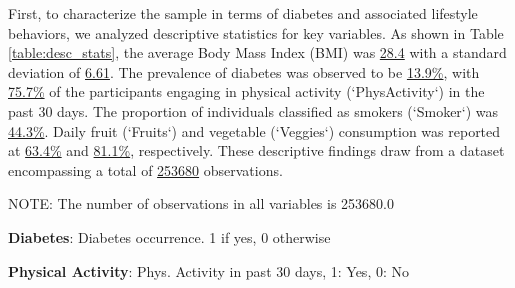 \documentclass[11pt]{article}
\begin{document}
First, to characterize the sample in terms of diabetes and associated lifestyle behaviors, we analyzed descriptive statistics for key variables. As shown in Table \ref{table:desc_stats}, the average Body Mass Index (BMI) was \hyperlink{A1a}{28.4} with a standard deviation of \hyperlink{A1b}{6.61}. The prevalence of diabetes was observed to be \hyperlink{A0a}{13.9\%}, with \hyperlink{A2a}{75.7\%} of the participants engaging in physical activity (`PhysActivity`) in the past 30 days. The proportion of individuals classified as smokers (`Smoker`) was \hyperlink{A3a}{44.3\%}. Daily fruit (`Fruits`) and vegetable (`Veggies`) consumption was reported at \hyperlink{A4a}{63.4\%} and \hyperlink{A5a}{81.1\%}, respectively. These descriptive findings draw from a dataset encompassing a total of \hyperlink{R0a}{253680} observations.

\begin{table}[h]
\caption{\protect\hyperlink{file-table-0-pkl}{Descriptive statistics of key variables}}
\label{table:desc_stats}
\begin{threeparttable}
\renewcommand{\TPTminimum}{\linewidth}
\begin{tablenotes}
\footnotesize
\item NOTE: The number of observations in all variables is 253680.0
\item \textbf{Diabetes}: Diabetes occurrence. 1 if yes, 0 otherwise
\item \textbf{Physical Activity}: Phys. Activity in past 30 days, 1: Yes, 0: No
\end{tablenotes}
\end{threeparttable}
\end{table}
\end{document}
